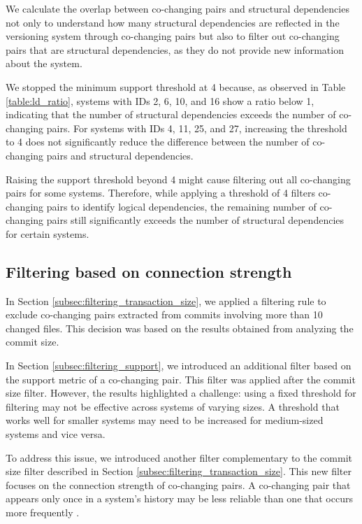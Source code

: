 We calculate the overlap between co-changing pairs and structural dependencies not only to understand how many structural dependencies are reflected in the versioning system through co-changing pairs but also to filter out co-changing pairs that are structural dependencies, as they do not provide new information about the system.

We stopped the minimum support threshold at 4 because, as observed in Table \ref{table:ld_ratio}, systems with IDs 2, 6, 10, and 16 show a ratio below 1, indicating that the number of structural dependencies exceeds the number of co-changing pairs. For systems with IDs 4, 11, 25, and 27, increasing the threshold to 4 does not significantly reduce the difference between the number of co-changing pairs and structural dependencies.

Raising the support threshold beyond 4 might cause filtering out all co-changing pairs for some systems. Therefore, while applying a threshold of 4 filters co-changing pairs to identify logical dependencies, the remaining number of co-changing pairs still significantly exceeds the number of structural dependencies for certain systems.






\subsection{Filtering based on connection strength}
\label{subsec:filtering_connection_strength}
In Section \ref{subsec:filtering_transaction_size}, we applied a filtering rule to exclude co-changing pairs extracted from commits involving more than 10 changed files. This decision was based on the results obtained from analyzing the commit size.

In Section \ref{subsec:filtering_support}, we introduced an additional filter based on the support metric of a co-changing pair. This filter was applied after the commit size filter. However, the results highlighted a challenge: using a fixed threshold for filtering may not be effective across systems of varying sizes. A threshold that works well for smaller systems may need to be increased for medium-sized systems and vice versa.

To address this issue, we introduced another filter complementary to the commit size filter described in Section \ref{subsec:filtering_transaction_size}. This new filter focuses on the connection strength of co-changing pairs. A co-changing pair that appears only once in a system's history may be less reliable than one that occurs more frequently \cite{cluster-access}.

